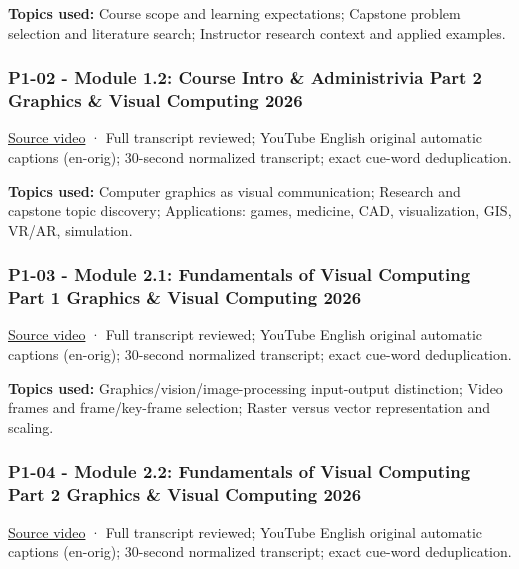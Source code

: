 \textbf{Topics used:} Course scope and learning expectations; Capstone problem selection and literature search; Instructor research context and applied examples.

\subsubsection{P1-02 - Module 1.2: Course Intro \& Administrivia Part 2 Graphics \& Visual Computing 2026}\label{04-visual-computing-ii-ch036-p1-02---module-1.2-course-intro-administrivia-part-2-graphics-visual-computing-2026}

\href{https://www.youtube.com/watch?v=SAqv-gqy0tA}{Source video} · Full transcript reviewed; YouTube English original automatic captions (en-orig); 30-second normalized transcript; exact cue-word deduplication.

\textbf{Topics used:} Computer graphics as visual communication; Research and capstone topic discovery; Applications: games, medicine, CAD, visualization, GIS, VR/AR, simulation.

\subsubsection{P1-03 - Module 2.1: Fundamentals of Visual Computing Part 1 Graphics \& Visual Computing 2026}\label{04-visual-computing-ii-ch036-p1-03---module-2.1-fundamentals-of-visual-computing-part-1-graphics-visual-computing-2026}

\href{https://www.youtube.com/watch?v=hoZcPvCIFyk}{Source video} · Full transcript reviewed; YouTube English original automatic captions (en-orig); 30-second normalized transcript; exact cue-word deduplication.

\textbf{Topics used:} Graphics/vision/image-processing input-output distinction; Video frames and frame/key-frame selection; Raster versus vector representation and scaling.

\subsubsection{P1-04 - Module 2.2: Fundamentals of Visual Computing Part 2 Graphics \& Visual Computing 2026}\label{04-visual-computing-ii-ch036-p1-04---module-2.2-fundamentals-of-visual-computing-part-2-graphics-visual-computing-2026}

\href{https://www.youtube.com/watch?v=KyFhkeTwnDE}{Source video} · Full transcript reviewed; YouTube English original automatic captions (en-orig); 30-second normalized transcript; exact cue-word deduplication.

